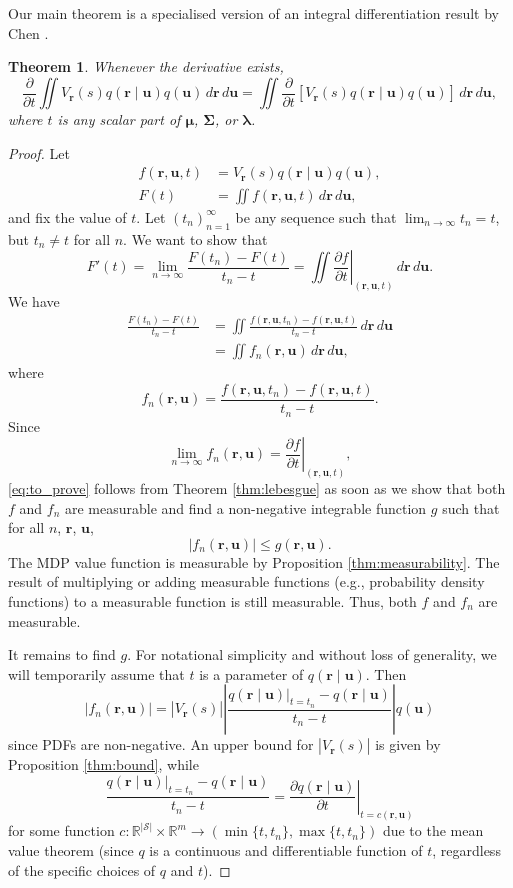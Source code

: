 \documentclass{mpaper}
\newtheorem{theorem}{Theorem}[section]
\newcommand{\V}{V_{\mathbf{r}}}
\newcommand{\dx}{\,d\mathbf{r}\,d\mathbf{u}}
\newcommand{\f}{f(\mathbf{r}, \mathbf{u}, t)}
\newcommand{\fn}{f_n(\mathbf{r}, \mathbf{u})}
\newcommand{\ftn}{f(\mathbf{r}, \mathbf{u}, t_n)}
\newcommand{\g}{g(\mathbf{r}, \mathbf{u})}
\newcommand{\dt}{\frac{\partial}{\partial t}}
\newcommand{\df}{\left.\frac{\partial f}{\partial t}\right|_{(\mathbf{r},
    \mathbf{u}, t)}}
\begin{document}
Our main theorem is a specialised version of an integral differentiation result
by Chen \cite{lecture_notes}.
\begin{theorem} \label{thm:main}
  Whenever the derivative exists,
  \[
    \dt\iint
    \V(s)q(\mathbf{r} \mid \mathbf{u})q(\mathbf{u})\dx
    = \iint
    \dt[\V(s)q(\mathbf{r} \mid \mathbf{u})q(\mathbf{u})]\dx,
  \]
  where $t$ is any scalar part of $\bm\mu$, $\bm\Sigma$, or $\bm\lambda$.
\end{theorem}
\begin{proof}
  Let
  \begin{align*}
    \f &= \V(s)q(\mathbf{r} \mid \mathbf{u})q(\mathbf{u}), \\
    F(t) &= \iint \f\dx,
  \end{align*}
  and fix the value of $t$. Let $(t_n)_{n=1}^\infty$ be any sequence such that
  $\lim_{n \to \infty} t_n = t$, but $t_n \ne t$ for all $n$. We want to show
  that
  \begin{equation} \label{eq:to_prove}
    F'(t) = \lim_{n \to \infty} \frac{F(t_n) - F(t)}{t_n - t} = \iint \df\dx.
  \end{equation}
  We have
  \[
    \begin{split}
      \frac{F(t_n) - F(t)}{t_n - t} &= \iint \frac{\ftn - \f}{t_n - t}\dx \\
      &= \iint \fn\dx,
    \end{split}
  \]
  where
  \[
    \fn = \frac{\ftn - \f}{t_n - t}.
  \]
  Since
  \[
    \lim_{n \to \infty} \fn = \df,
  \]
  \eqref{eq:to_prove} follows from Theorem \ref{thm:lebesgue} as soon as we show
  that both $f$ and $f_n$ are measurable and find a non-negative integrable
  function $g$ such that for all $n$, $\mathbf{r}$, $\mathbf{u}$,
  \[
    |\fn| \le \g.
  \]
  The MDP value function is measurable by Proposition \ref{thm:measurability}.
  The result of multiplying or adding measurable functions (e.g., probability
  density functions) to a measurable function is still measurable. Thus,
  both $f$ and $f_n$ are measurable.

  It remains to find $g$. For notational simplicity and without loss of
  generality, we will temporarily assume that $t$ is a parameter of
  $q(\mathbf{r} \mid \mathbf{u})$. Then
  \[
    |\fn| = |\V(s)| \left| \frac{q(\mathbf{r} \mid \mathbf{u})|_{t =
          t_n} - q(\mathbf{r} \mid \mathbf{u})}{t_n - t} \right| q(\mathbf{u})
  \]
  since PDFs are non-negative. An upper bound for
  $|\V(s)|$ is given by Proposition \ref{thm:bound}, while
  \[
    \frac{q(\mathbf{r} \mid \mathbf{u})|_{t = t_n} - q(\mathbf{r} \mid \mathbf{u})}{t_n - t} = \left.
      \frac{\partial q(\mathbf{r} \mid \mathbf{u})}{\partial t} \right|_{t = c(\mathbf{r},
      \mathbf{u})}
  \]
  for some function $c : \mathbb{R}^{|\mathcal{S}|} \times \mathbb{R}^m \to
  (\min\{t, t_n\}, \max\{t, t_n\})$ due to the mean value theorem (since $q$ is
  a continuous and differentiable function of $t$, regardless of the specific
  choices of $q$ and $t$).


\end{proof}
\end{document}
